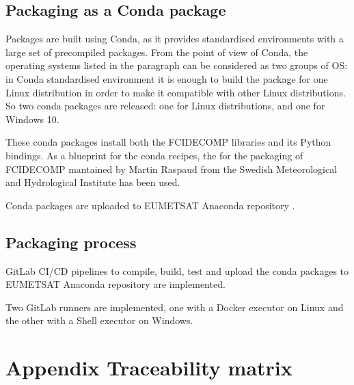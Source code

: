 \documentclass[a4paper,10pt,english]{sphinxmanual}
\begin{document}
\section{Packaging as a Conda package}
\label{\detokenize{packaging_and_deployment:packaging-as-a-conda-package}}
\sphinxAtStartPar
Packages are built using Conda, as it provides standardised environments with a large set of pre\sphinxhyphen{}compiled packages.
From the point of view of Conda, the operating systems listed in the {\hyperref[\detokenize{packaging_and_deployment:supported-platforms}]{}}
paragraph can be considered as two groups of OS: in Conda standardised environment it is enough to build the package for
one Linux distribution in order to make it compatible with other Linux distributions. So two conda packages are
released: one for Linux distributions, and one for Windows 10.

\sphinxAtStartPar
These conda packages install both the FCIDECOMP libraries and its Python bindings. As a blueprint for the
conda recipes, the {\hyperref[\detokenize{introduction:fcidecomp-conda}]{}} for the packaging of FCIDECOMP mantained by Martin Raspaud
from the Swedish Meteorological and Hydrological Institute has been used.

\sphinxAtStartPar
Conda packages are uploaded to EUMETSAT Anaconda repository .


\section{Packaging process}
\label{\detokenize{packaging_and_deployment:packaging-process}}
\sphinxAtStartPar
GitLab CI/CD pipelines to compile, build, test and upload the conda packages to EUMETSAT Anaconda repository are
implemented.

\sphinxAtStartPar
Two GitLab runners are implemented, one with a Docker executor on Linux and the other with a Shell executor on Windows.


\chapter{Appendix \sphinxhyphen{} Traceability matrix}
\label{\detokenize{a_traceability_matrix:appendix-traceability-matrix}}\label{\detokenize{a_traceability_matrix::doc}}
\end{document}
